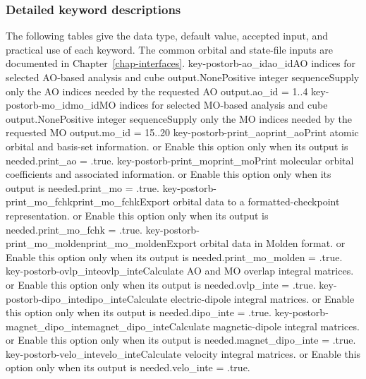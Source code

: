 \subsubsection*{Detailed keyword descriptions}
The following tables give the data type, default value, accepted input, and practical use of each keyword. The common orbital and state-file inputs are documented in Chapter~\ref{chap-interfaces}.
\keyword
{key-postorb-ao_id}{ao\_id}{AO indices for selected AO-based analysis and cube output.}{\OpOptional}{\OpIntseq}{None}{Positive integer sequence}{Supply only the AO indices needed by the requested AO output.}{ao\_id = 1..4}
\keyword
{key-postorb-mo_id}{mo\_id}{MO indices for selected MO-based analysis and cube output.}{\OpOptional}{\OpIntseq}{None}{Positive integer sequence}{Supply only the MO indices needed by the requested MO output.}{mo\_id = 15..20}
\keyword
{key-postorb-print_ao}{print\_ao}{Print atomic orbital and basis-set information.}{\OpOptional}{\OpLogic}{\OpFalse}{\OpTrue{} or \OpFalse}{Enable this option only when its output is needed.}{print\_ao = .true.}
\keyword
{key-postorb-print_mo}{print\_mo}{Print molecular orbital coefficients and associated information.}{\OpOptional}{\OpLogic}{\OpFalse}{\OpTrue{} or \OpFalse}{Enable this option only when its output is needed.}{print\_mo = .true.}
\keyword
{key-postorb-print_mo_fchk}{print\_mo\_fchk}{Export orbital data to a formatted-checkpoint representation.}{\OpOptional}{\OpLogic}{\OpFalse}{\OpTrue{} or \OpFalse}{Enable this option only when its output is needed.}{print\_mo\_fchk = .true.}
\keyword
{key-postorb-print_mo_molden}{print\_mo\_molden}{Export orbital data in Molden format.}{\OpOptional}{\OpLogic}{\OpFalse}{\OpTrue{} or \OpFalse}{Enable this option only when its output is needed.}{print\_mo\_molden = .true.}
\keyword
{key-postorb-ovlp_inte}{ovlp\_inte}{Calculate AO and MO overlap integral matrices.}{\OpOptional}{\OpLogic}{\OpFalse}{\OpTrue{} or \OpFalse}{Enable this option only when its output is needed.}{ovlp\_inte = .true.}
\keyword
{key-postorb-dipo_inte}{dipo\_inte}{Calculate electric-dipole integral matrices.}{\OpOptional}{\OpLogic}{\OpFalse}{\OpTrue{} or \OpFalse}{Enable this option only when its output is needed.}{dipo\_inte = .true.}
\keyword
{key-postorb-magnet_dipo_inte}{magnet\_dipo\_inte}{Calculate magnetic-dipole integral matrices.}{\OpOptional}{\OpLogic}{\OpFalse}{\OpTrue{} or \OpFalse}{Enable this option only when its output is needed.}{magnet\_dipo\_inte = .true.}
\keyword
{key-postorb-velo_inte}{velo\_inte}{Calculate velocity integral matrices.}{\OpOptional}{\OpLogic}{\OpFalse}{\OpTrue{} or \OpFalse}{Enable this option only when its output is needed.}{velo\_inte = .true.}
